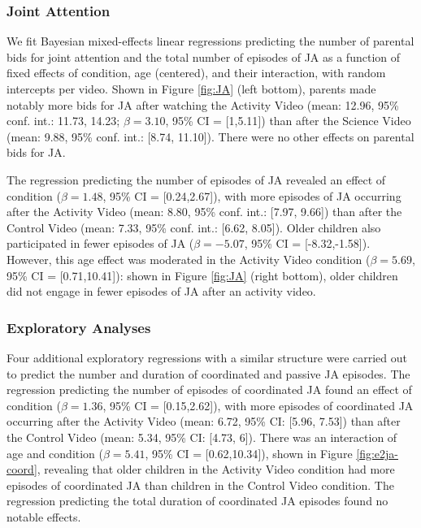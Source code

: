 \documentclass[man,floatsintext]{apa6}
\begin{document}
\hypertarget{joint-attention-1}{%
\subsubsection{Joint Attention}\label{joint-attention-1}}

We fit Bayesian mixed-effects linear regressions predicting the number of parental bids for joint attention and the total number of episodes of JA as a function of fixed effects of condition, age (centered), and their interaction, with random intercepts per video.
Shown in Figure \ref{fig:JA} (left bottom), parents made notably more bids for JA after watching the Activity Video (mean: 12.96, 95\% conf. int.: 11.73, 14.23; \(\beta=3.10\), 95\% CI = {[}1,5.11{]}) than after the Science Video (mean: 9.88, 95\% conf. int.: {[}8.74, 11.10{]}).
There were no other effects on parental bids for JA.

The regression predicting the number of episodes of JA revealed an effect of condition (\(\beta=1.48\), 95\% CI = {[}0.24,2.67{]}), with more episodes of JA occurring after the Activity Video (mean: 8.80, 95\% conf. int.: {[}7.97, 9.66{]}) than after the Control Video (mean: 7.33, 95\% conf. int.: {[}6.62, 8.05{]}).
Older children also participated in fewer episodes of JA (\(\beta=-5.07\), 95\% CI = {[}-8.32,-1.58{]}).
However, this age effect was moderated in the Activity Video condition (\(\beta=5.69\), 95\% CI = {[}0.71,10.41{]}): shown in Figure \ref{fig:JA} (right bottom), older children did not engage in fewer episodes of JA after an activity video.

\hypertarget{exploratory-analyses-1}{%
\subsubsection{Exploratory Analyses}\label{exploratory-analyses-1}}

Four additional exploratory regressions with a similar structure were carried out to predict the number and duration of coordinated and passive JA episodes.
The regression predicting the number of episodes of coordinated JA found an effect of condition (\(\beta=1.36\), 95\% CI = {[}0.15,2.62{]}), with more episodes of coordinated JA occurring after the Activity Video (mean: 6.72, 95\% CI: {[}5.96, 7.53{]}) than after the Control Video (mean: 5.34, 95\% CI: {[}4.73, 6{]}).
There was an interaction of age and condition (\(\beta=5.41\), 95\% CI = {[}0.62,10.34{]}), shown in Figure \ref{fig:e2ja-coord}, revealing that older children in the Activity Video condition had more episodes of coordinated JA than children in the Control Video condition.
The regression predicting the total duration of coordinated JA episodes found no notable effects.
\end{document}
